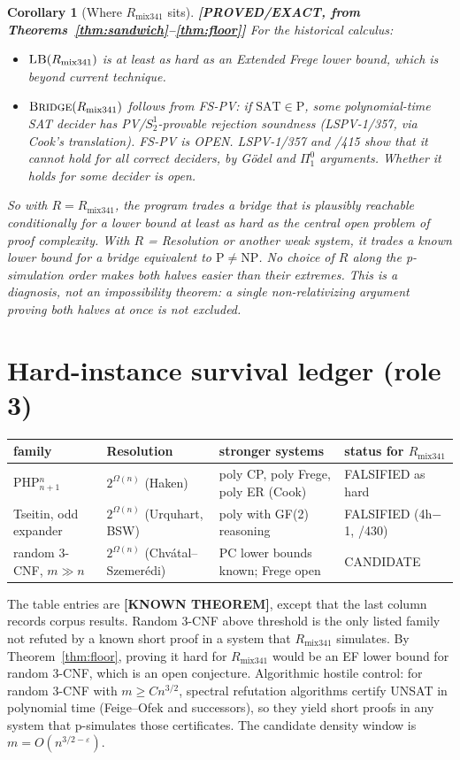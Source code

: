 \documentclass[11pt]{article}
\newtheorem{corollary}[theorem]{Corollary}
\theoremstyle{remark}
\newcommand{\SAT}{\mathrm{SAT}}
\newcommand{\status}[1]{\textbf{[#1]}}
\newcommand{\Rmix}{R_{\mathrm{mix341}}}
\begin{document}
\begin{corollary}[Where $\Rmix$ sits]
\status{PROVED/EXACT, from Theorems~\ref{thm:sandwich}--\ref{thm:floor}} For the historical calculus:
\begin{itemize}
\item $\textsc{LB}(\Rmix)$ is at least as hard as an Extended Frege lower bound, which is beyond
current technique.
\item $\textsc{Bridge}(\Rmix)$ follows from FS-PV: \emph{if $\SAT\in\mathrm P$, some polynomial-time
SAT decider has PV/$S^1_2$-provable rejection soundness} (LSPV-1/357, via Cook's translation).
FS-PV is OPEN. LSPV-1/357 and /415 show that it cannot hold for \emph{all} correct deciders, by
Gödel and $\Pi^0_1$ arguments. Whether it holds for \emph{some} decider is open.
\end{itemize}
So with $R=\Rmix$, the program trades a bridge that is plausibly reachable conditionally for a
lower bound at least as hard as the central open problem of proof complexity. With $R$ =
Resolution or another weak system, it trades a known lower bound for a bridge equivalent to
$\mathrm P\ne\mathrm{NP}$. No choice of $R$ along the p-simulation order makes both halves
easier than their extremes. This is a diagnosis, not an impossibility theorem: a single
non-relativizing argument proving both halves at once is not excluded.
\end{corollary}

\section{Hard-instance survival ledger (role 3)}
\begin{center}\small
\begin{tabular}{@{}llll@{}}
\toprule
family & Resolution & stronger systems & status for $\Rmix$\\
\midrule
PHP$^{n}_{n+1}$ & $2^{\Omega(n)}$ (Haken) & poly CP, poly Frege, poly ER (Cook) & FALSIFIED as hard\\
Tseitin, odd expander & $2^{\Omega(n)}$ (Urquhart, BSW) & poly with GF(2) reasoning & FALSIFIED (4h$-$1, /430)\\
random 3-CNF, $m\gg n$ & $2^{\Omega(n)}$ (Chvátal--Szemerédi) & PC lower bounds known; Frege open & CANDIDATE\\
\bottomrule
\end{tabular}
\end{center}
The table entries are \status{KNOWN THEOREM}, except that the last column records corpus results.
Random 3-CNF above threshold is the only listed family not refuted by a known short proof in a
system that $\Rmix$ simulates. By Theorem~\ref{thm:floor}, proving it hard for $\Rmix$ would be an
EF lower bound for random 3-CNF, which is an open conjecture. Algorithmic hostile control: for
random 3-CNF with $m\ge Cn^{3/2}$, spectral refutation algorithms certify UNSAT in polynomial time
(Feige--Ofek and successors), so they yield short proofs in any system that p-simulates those
certificates. The candidate density window is $m=O(n^{3/2-\varepsilon})$.
\end{document}
